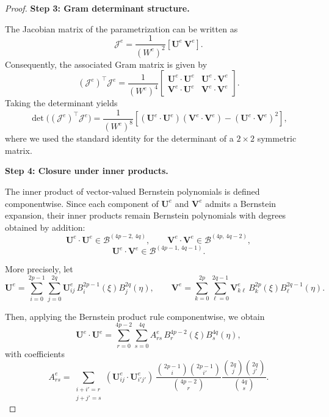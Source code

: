 \documentclass{jssc}
\begin{document}
\begin{proof}
\textbf{Step 3: Gram determinant structure.}

The Jacobian matrix of the parametrization can be written as
\begin{equation}
\bm{\mathcal{J}}^e
=
\frac{1}{(W^e)^2}
[\mathbf{U}^e \ \mathbf{V}^e].
\end{equation}
Consequently, the associated Gram matrix is given by
\begin{equation}
(\bm{\mathcal{J}}^e)^\top \bm{\mathcal{J}}^e
=
\frac{1}{(W^e)^4}
\begin{bmatrix}
\mathbf{U}^e \!\cdot\! \mathbf{U}^e & \mathbf{U}^e \!\cdot\! \mathbf{V}^e \\
\mathbf{V}^e \!\cdot\! \mathbf{U}^e & \mathbf{V}^e \!\cdot\! \mathbf{V}^e
\end{bmatrix}.
\end{equation}
Taking the determinant yields
\begin{equation}
\det\!\big((\bm{\mathcal{J}}^e)^\top \bm{\mathcal{J}}^e\big)
=
\frac{1}{(W^e)^8}
\left[
(\mathbf{U}^e\!\cdot\!\mathbf{U}^e)
(\mathbf{V}^e\!\cdot\!\mathbf{V}^e)
-
(\mathbf{U}^e\!\cdot\!\mathbf{V}^e)^2
\right],
\label{eq:gram-structure}
\end{equation}
where we used the standard identity for the determinant of a $2\times2$ symmetric matrix.

\textbf{Step 4: Closure under inner products.}

The inner product of vector-valued Bernstein polynomials is defined componentwise. 
Since each component of $\mathbf{U}^e$ and $\mathbf{V}^e$ admits a Bernstein expansion, their inner products remain Bernstein polynomials with degrees obtained by addition:
\begin{equation}
\mathbf{U}^e\cdot\mathbf{U}^e \in \mathcal{B}^{(4p-2,\,4q)},
\qquad
\mathbf{V}^e\cdot\mathbf{V}^e \in \mathcal{B}^{(4p,\,4q-2)},
\end{equation}
\begin{equation}
\mathbf{U}^e\cdot\mathbf{V}^e \in \mathcal{B}^{(4p-1,\,4q-1)}.
\end{equation}

More precisely, let
\begin{equation}
\mathbf{U}^e
=
\sum_{i=0}^{2p-1}\sum_{j=0}^{2q}
\mathbf{U}^e_{ij} \, B_i^{2p-1}(\xi) B_j^{2q}(\eta),
\qquad
\mathbf{V}^e
=
\sum_{k=0}^{2p}\sum_{\ell=0}^{2q-1}
\mathbf{V}^e_{k\ell} \, B_k^{2p}(\xi) B_\ell^{2q-1}(\eta).
\end{equation}

Then, applying the Bernstein product rule componentwise, we obtain
\begin{equation}
\mathbf{U}^e \cdot \mathbf{U}^e
=
\sum_{r=0}^{4p-2}\sum_{s=0}^{4q}
A_{rs}^e \, B_r^{4p-2}(\xi) B_s^{4q}(\eta),
\end{equation}
with coefficients
\begin{equation}
A_{rs}^e
=
\sum_{\substack{i+i'=r \\ j+j'=s}}
(\mathbf{U}^e_{ij} \cdot \mathbf{U}^e_{i'j'})
\,
\frac{\binom{2p-1}{i}\binom{2p-1}{i'}}{\binom{4p-2}{r}}
\frac{\binom{2q}{j}\binom{2q}{j'}}{\binom{4q}{s}}.
\end{equation}


\end{proof}
\end{document}
